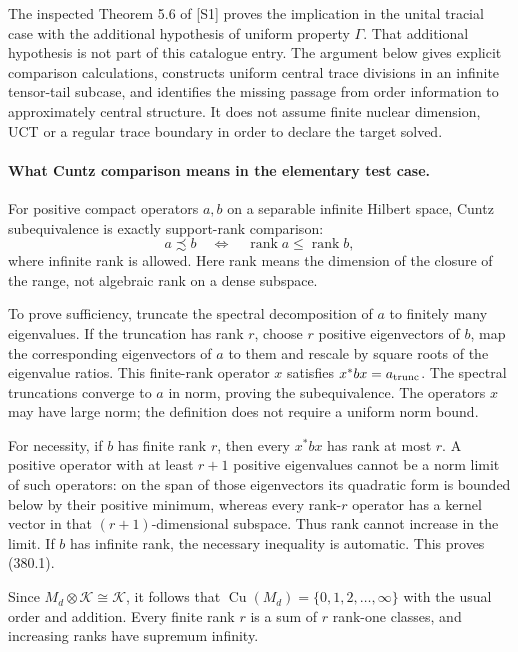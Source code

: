 \documentclass[11pt]{article}
\begin{document}
The inspected Theorem 5.6 of [S1] proves the implication in the
unital tracial case with the additional hypothesis of uniform
property $\Gamma$. That additional hypothesis is not part of
this catalogue entry. The argument below gives explicit comparison
calculations, constructs uniform central trace divisions in an
infinite tensor-tail subcase, and identifies the missing passage
from order information to approximately central structure. It
does not assume finite nuclear dimension, UCT or a regular trace
boundary in order to declare the target solved.

\paragraph{What Cuntz comparison means in the elementary test case.}
For positive compact operators $a,b$ on a separable infinite
Hilbert space, Cuntz subequivalence is exactly support-rank
comparison:
\[
 a\precsim b\quad\Longleftrightarrow\quad
      \operatorname{rank}a\leq\operatorname{rank}b,
 \tag{380.1}
\]
where infinite rank is allowed. Here rank means the dimension of
the closure of the range, not algebraic rank on a dense subspace.

To prove sufficiency, truncate the spectral decomposition of $a$
to finitely many eigenvalues. If the truncation has rank $r$,
choose $r$ positive eigenvectors of $b$, map the corresponding
eigenvectors of $a$ to them and rescale by square roots of the
eigenvalue ratios. This finite-rank operator $x$ satisfies
$x^*bx=a_{\rm trunc}$. The spectral truncations converge to $a$
in norm, proving the subequivalence. The operators $x$ may have
large norm; the definition does not require a uniform norm bound.

For necessity, if $b$ has finite rank $r$, then every $x^*bx$ has
rank at most $r$. A positive operator with at least $r+1$
positive eigenvalues cannot be a norm limit of such operators:
on the span of those eigenvectors its quadratic form is bounded
below by their positive minimum, whereas every rank-$r$ operator
has a kernel vector in that $(r+1)$-dimensional subspace. Thus
rank cannot increase in the limit. If $b$ has infinite rank,
the necessary inequality is automatic. This proves (380.1).

Since $M_d\otimes\mathcal K\cong\mathcal K$, it follows that
$\operatorname{Cu}(M_d)=\{0,1,2,\ldots,\infty\}$ with the
usual order and addition. Every finite rank $r$ is a sum of
$r$ rank-one classes, and increasing ranks have supremum infinity.
\end{document}
